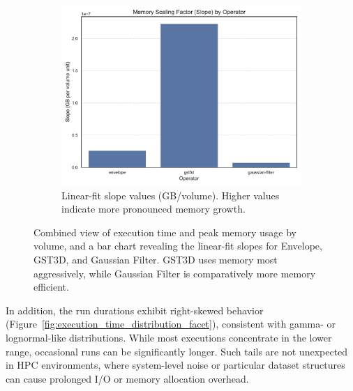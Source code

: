 \begin{figure}[htbp]
    \begin{subfigure}[t]{0.49\textwidth}
        \centering
        \includegraphics[width=\textwidth]{assets/images/05/cross_operator_memory_scaling_factor}
        \caption{Linear-fit slope values (GB/volume). Higher values indicate more pronounced memory growth.}
    \end{subfigure}
    \caption{Combined view of execution time and peak memory usage by volume, and a bar chart revealing the linear-fit slopes for Envelope, \ac{GST3D}, and Gaussian Filter. \ac{GST3D} uses memory most aggressively, while Gaussian Filter is comparatively more memory efficient.}
    \label{fig:ex_peak_mu_facet}
\end{figure}

In addition, the run durations exhibit right-skewed behavior (Figure~\ref{fig:execution_time_distribution_facet}), consistent with gamma- or lognormal-like distributions.
While most executions concentrate in the lower range, occasional runs can be significantly longer.
Such tails are not unexpected in \ac{HPC} environments, where system-level noise or particular dataset structures can cause prolonged I/O or memory allocation overhead.

